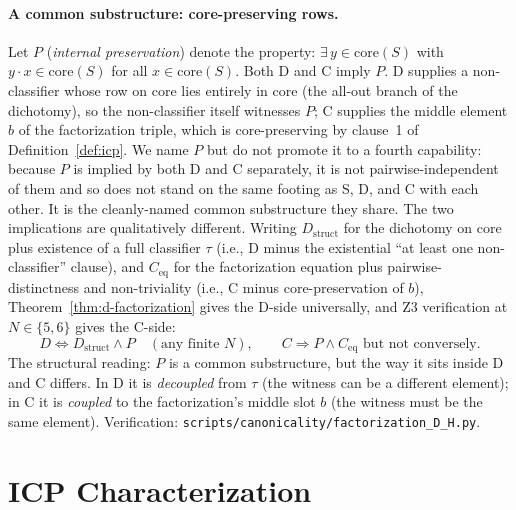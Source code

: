 \documentclass[sigconf,screen]{acmart}
\newcommand{\dotop}{\cdot}
\newcommand{\core}{\mathrm{core}}
\theoremstyle{remark}
\begin{document}
\paragraph{A common substructure: core-preserving rows.}
\label{para:P}
Let $P$ (\emph{internal preservation}) denote the property: $\exists\, y \in \core(S)$ with $y \dotop x \in \core(S)$ for all $x \in \core(S)$. Both D and C imply $P$. D supplies a non-classifier whose row on core lies entirely in $\core$ (the all-out branch of the dichotomy), so the non-classifier itself witnesses $P$; C supplies the middle element $b$ of the factorization triple, which is core-preserving by clause~1 of Definition~\ref{def:icp}. We name $P$ but do not promote it to a fourth capability: because $P$ is implied by both D and C separately, it is not pairwise-independent of them and so does not stand on the same footing as S, D, and C with each other. It is the cleanly-named common substructure they share. The two implications are qualitatively different. Writing $D_{\mathrm{struct}}$ for the dichotomy on core plus existence of a full classifier $\tau$ (i.e., D minus the existential ``at least one non-classifier'' clause), and $C_{\mathrm{eq}}$ for the factorization equation plus pairwise-distinctness and non-triviality (i.e., C minus core-preservation of $b$), Theorem~\ref{thm:d-factorization} gives the D-side universally, and Z3 verification at $N \in \{5, 6\}$ gives the C-side:
\[
  D \iff D_{\mathrm{struct}} \wedge P \quad (\text{any finite } N), \qquad
  C \Rightarrow P \wedge C_{\mathrm{eq}} \text{ but not conversely.}
\]
The structural reading: $P$ is a common substructure, but the way it sits inside D and C differs. In D it is \emph{decoupled} from $\tau$ (the witness can be a different element); in C it is \emph{coupled} to the factorization's middle slot $b$ (the witness must be the same element). Verification: \texttt{scripts/canonicality/factorization\_D\_H.py}.

\section{ICP Characterization}
\label{sec:icp}
\end{document}
